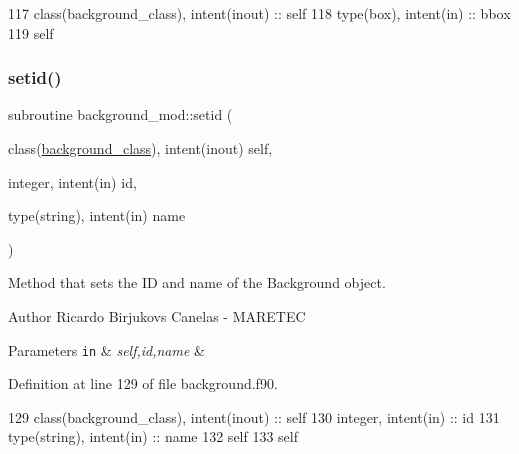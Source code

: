 \begin{DoxyCode}
117     \textcolor{keywordtype}{class}(background\_class), \textcolor{keywordtype}{intent(inout)} :: self
118     \textcolor{keywordtype}{type}(box), \textcolor{keywordtype}{intent(in)} :: bbox
119     self%
\end{DoxyCode}
\mbox{\label{namespacebackground__mod_a4feaccf688558d8590ece4f09c65c977}} 
\subsubsection{\texorpdfstring{setid()}{setid()}}
{\footnotesize\ttfamily subroutine background\+\_\+mod\+::setid (\begin{DoxyParamCaption}\item[{class(\mbox{\hyperlink{structbackground__mod_1_1background__class}{background\+\_\+class}}), intent(inout)}]{self,  }\item[{integer, intent(in)}]{id,  }\item[{type(string), intent(in)}]{name }\end{DoxyParamCaption})\hspace{0.3cm}{\ttfamily [private]}}



Method that sets the ID and name of the Background object. 

\begin{DoxyAuthor}{Author}
Ricardo Birjukovs Canelas -\/ M\+A\+R\+E\+T\+EC 
\end{DoxyAuthor}

\begin{DoxyParams}[1]{Parameters}
\mbox{\tt in}  & {\em self,id,name} & \\
\hline
\end{DoxyParams}


Definition at line 129 of file background.\+f90.


\begin{DoxyCode}
129     \textcolor{keywordtype}{class}(background\_class), \textcolor{keywordtype}{intent(inout)} :: self
130     \textcolor{keywordtype}{integer}, \textcolor{keywordtype}{intent(in)} :: id
131     \textcolor{keywordtype}{type}(string), \textcolor{keywordtype}{intent(in)} :: name
132     self%
133     self%
\end{DoxyCode}
\mbox{\label{namespacebackground__mod_a3cee95b9b5d3aae83df33334981f2b27}} 

